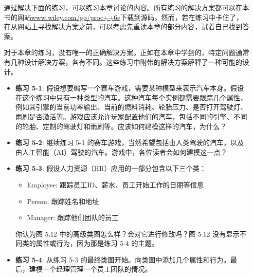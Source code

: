 通过解决下面的练习，可以练习本章讨论的内容。所有练习的解决方案都可以在本书的网站\url{www.wiley.com/go/proc++6e}下载到源码。然而，若在练习中卡住了，在从网站上寻找解决方案之前，可以考虑先重读本章的部分内容，试着自己找到答案。

对于本章的练习，没有唯一的正确解决方案。正如在本章中学到的，特定问题通常有几种设计解决方案，各有不同。这些练习中附带的解决方案解释了一种可能的设计。

\begin{itemize}
\item
\textbf{练习 5-1}: 假设想要编写一个赛车游戏，需要某种模型来表示汽车本身。假设在这个练习中只有一种类型的汽车。这种汽车每个实例都需要跟踪几个属性，例如其引擎的当前功率输出、当前的燃料消耗、轮胎压力、是否打开驾驶灯、雨刷是否激活等。游戏应该允许玩家配置他们的汽车，包括不同的引擎、不同的轮胎、定制的驾驶灯和雨刷等。应该如何建模这样的汽车，为什么？

\item
\textbf{练习 5-2}: 继续练习 5-1 的赛车游戏，当然希望包括由人类驾驶的汽车，以及由人工智能（AI）驾驶的汽车。游戏中，各位读者会如何建模这一点？

\item
\textbf{练习 5-3}: 假设人力资源（HR）应用的一部分包含以下三个类：

\begin{itemize}
\item
Employee: 跟踪员工ID、薪水、员工开始工作的日期等信息

\item
Person: 跟踪姓名和地址

\item
Manager: 跟踪他们团队的员工
\end{itemize}

你认为图 5.12 中的高级类图怎么样？会对它进行修改吗？图 5.12 没有显示不同类的属性或行为，因为那是练习 5-4 的主题。


\item
\textbf{练习 5-4}: 从练习 5-3 的最终类图开始。向类图中添加几个属性和行为。最后，建模一个经理管理一个员工团队的情况。
\end{itemize}







